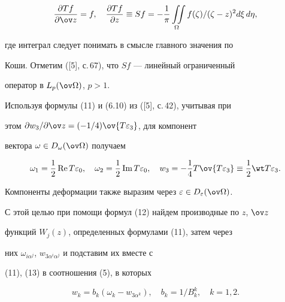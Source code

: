 \begin{equation} 


\frac{\partial T f}{\partial\ov z}=f,\quad 


\frac{\partial T f}{\partial z}\equiv S f=-\frac{1}{\pi} 


\iint\limits_\Omega f(\zeta)/(\zeta-z)^2d\xi\,d\eta, 


\end{equation} 


где интеграл следует понимать в смысле главного значения по 


Коши. Отметим ([5], с.\,67), что $S f$ --- линейный ограниченный 


оператор в $L_p(\ov\Omega)$, $p>1$. 


 


Используя формулы (11) и (6.10) из ([5], с.\,42), учитывая при 


этом $\partial w_3/\partial\ov z=(-1/4)\ov{T\varepsilon_3}$, для компонент 


вектора $\omega\in D_\omega(\ov\Omega)$ получаем 


\begin{equation} 


\omega_1=\frac{1}{2}\re T\varepsilon_0,\quad 


\omega_2=\frac{1}{2}\im T\varepsilon_0,\quad 


w_3=-\frac{1}{4}T\ov{T\varepsilon_3}\equiv 


\frac{1}{2}\wt T\varepsilon_3. 


\end{equation} 


Компоненты деформации также выразим через $\varepsilon\in 


D_\varepsilon(\ov\Omega)$. 


С этой целью при помощи формул (12) найдем производные по $z$, $\ov z$ 


функций $W_j(z)$, определенных формулами (11), затем через 


них $\omega_{i\alpha^j}$, $w_{3\alpha^i\alpha^j}$ и подставим их вместе с 


(11), (13) в соотношения (5), в которых 


\begin{equation} 


w_k=b_k(\omega_k-w_{3\alpha^k}),\quad 


b_k=1/B^k_k,\quad k=1,2. 


\end{equation} 


